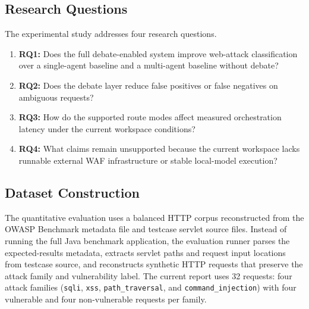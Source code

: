 \documentclass{ieeeaccess}
\newcommand{\artifact}[1]{\texttt{\detokenize{#1}}}
\begin{document}
\subsection{Research Questions}
The experimental study addresses four research questions.
\begin{enumerate}
\item \textbf{RQ1:} Does the full debate-enabled system improve web-attack classification over a single-agent baseline and a multi-agent baseline without debate?
\item \textbf{RQ2:} Does the debate layer reduce false positives or false negatives on ambiguous requests?
\item \textbf{RQ3:} How do the supported route modes affect measured orchestration latency under the current workspace conditions?
\item \textbf{RQ4:} What claims remain unsupported because the current workspace lacks runnable external WAF infrastructure or stable local-model execution?
\end{enumerate}

\subsection{Dataset Construction}
The quantitative evaluation uses a balanced HTTP corpus reconstructed from the OWASP Benchmark metadata file \artifact{expectedresults-1.2.csv} and testcase servlet source files. Instead of running the full Java benchmark application, the evaluation runner parses the expected-results metadata, extracts servlet paths and request input locations from testcase source, and reconstructs synthetic HTTP requests that preserve the attack family and vulnerability label. The current report uses 32 requests: four attack families (\texttt{sqli}, \texttt{xss}, \texttt{path\_traversal}, and \texttt{command\_injection}) with four vulnerable and four non-vulnerable requests per family.
\end{document}

